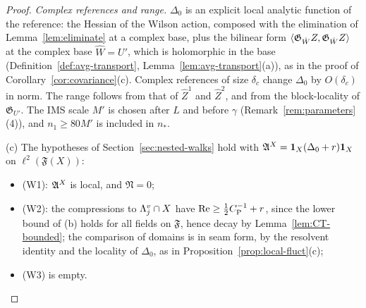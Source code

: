 \begin{proof}
\emph{Complex references and range.} $\Delta_0$ is an explicit local analytic function of the reference: the Hessian of the Wilson action, composed with the elimination of Lemma~\ref{lem:eliminate} at a complex base, plus the bilinear form $\langle \mathfrak G_{\hat W}Z,\mathfrak G_{\hat W}Z\rangle$ at the complex base $\hat W=U'$, which is holomorphic in the base (Definition~\ref{def:avg-transport}, Lemma~\ref{lem:avg-transport}(a)), as in the proof of Corollary~\ref{cor:covariance}(c). Complex references of size $\delta_c$ change $\Delta_0$ by $O(\delta_c)$ in norm. The range follows from that of $\hat Z^1$ and $\hat Z^2$, and from the block-locality of $\mathfrak G_{U'}$. The IMS scale $M'$ is chosen after $L$ and before $\gamma$ (Remark~\ref{rem:parameters}(4)), and $n_1\ge80M'$ is included in $n_*$.

(c) The hypotheses of Section~\ref{sec:nested-walks} hold with $\mathfrak A^X=\mathbf 1_X(\Delta_0+r)\mathbf 1_X$ on $\ell^2(\mathfrak F(X))$:
\begin{itemize}
\item (W1): $\mathfrak A^X$ is local, and $\mathfrak N=0$;
\item (W2): the compressions to $\Lambda^v_j\cap X$ have $\operatorname{Re}\ge\frac12C_{\rm P}^{-1}+r$, since the lower bound of (b) holds for all fields on $\mathfrak F$, hence decay by Lemma~\ref{lem:CT-bounded}; the comparison of domains is in seam form, by the resolvent identity and the locality of $\Delta_0$, as in Proposition~\ref{prop:local-fluct}(c);
\item (W3) is empty.
\end{itemize}

\end{proof}
